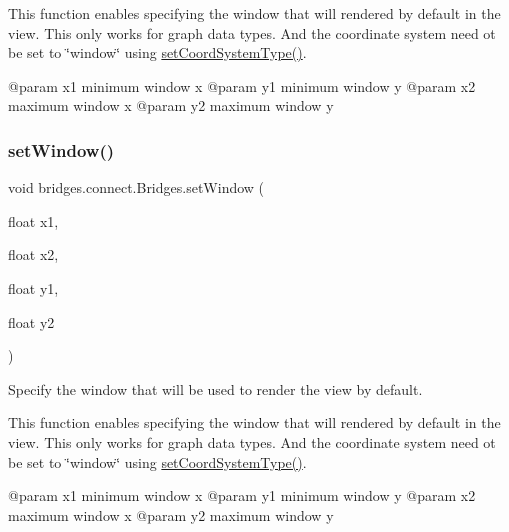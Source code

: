 This function enables specifying the window that will rendered by default in the view. This only works for graph data types. And the coordinate system need ot be set to \char`\"{}window\char`\"{} using \mbox{\hyperlink{classbridges_1_1connect_1_1_bridges_ade4a9c43e2b608e6b3dc774b73f95749}{set\+Coord\+System\+Type()}}. \begin{DoxyVerb}@param x1   minimum window x
@param y1   minimum window y
@param x2   maximum window x
@param y2   maximum window y
\end{DoxyVerb}
 \mbox{\label{classbridges_1_1connect_1_1_bridges_afff6882285f7615b775c59b2fc62b1c3}} 
\subsubsection{\texorpdfstring{setWindow()}{setWindow()}\hspace{0.1cm}{\footnotesize\ttfamily [2/3]}}
{\footnotesize\ttfamily void bridges.\+connect.\+Bridges.\+set\+Window (\begin{DoxyParamCaption}\item[{float}]{x1,  }\item[{float}]{x2,  }\item[{float}]{y1,  }\item[{float}]{y2 }\end{DoxyParamCaption})}



Specify the window that will be used to render the view by default. 

This function enables specifying the window that will rendered by default in the view. This only works for graph data types. And the coordinate system need ot be set to \char`\"{}window\char`\"{} using \mbox{\hyperlink{classbridges_1_1connect_1_1_bridges_ade4a9c43e2b608e6b3dc774b73f95749}{set\+Coord\+System\+Type()}}. \begin{DoxyVerb}@param x1   minimum window x
@param y1   minimum window y
@param x2   maximum window x
@param y2   maximum window y
\end{DoxyVerb}
 \mbox{\label{classbridges_1_1connect_1_1_bridges_a163a32a2fd3327c59d003f457e31eb63}} 
